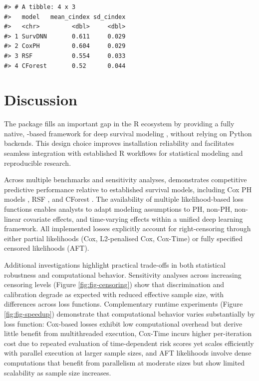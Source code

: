 \begin{verbatim}
#> # A tibble: 4 x 3
#>   model   mean_cindex sd_cindex
#>   <chr>         <dbl>     <dbl>
#> 1 SurvDNN       0.611     0.029
#> 2 CoxPH         0.604     0.029
#> 3 RSF           0.554     0.033
#> 4 CForest       0.52      0.044
\end{verbatim}

\section{Discussion}\label{discussion}

The  package fills an important gap in the R ecosystem by providing a fully native, -based framework for deep survival modeling \citep{falbel2024torch}, without relying on Python backends. This design choice improves installation reliability and facilitates seamless integration with established R workflows for statistical modeling and reproducible research.

Across multiple benchmarks and sensitivity analyses,  demonstrates competitive predictive performance relative to established survival models, including Cox PH models \citep{cox1972regression}, RSF \citep{ishwaran2008random}, and CForest \citep{hothorn2006survival}. The availability of multiple likelihood-based loss functions enables analysts to adapt modeling assumptions to PH, non-PH, non-linear covariate effects, and time-varying effects within a unified deep learning framework. All implemented losses explicitly account for right-censoring through either partial likelihoods (Cox, L2-penalised Cox, Cox-Time) or fully specified censored likelihoods (AFT).

Additional investigations highlight practical trade-offs in both statistical robustness and computational behavior. Sensitivity analyses across increasing censoring levels (Figure \ref{fig:fig-censoring}) show that discrimination and calibration degrade as expected with reduced effective sample size, with differences across loss functions. Complementary runtime experiments (Figure \ref{fig:fig-speedup}) demonstrate that computational behavior varies substantially by loss function: Cox-based losses exhibit low computational overhead but derive little benefit from multithreaded execution, Cox-Time incurs higher per-iteration cost due to repeated evaluation of time-dependent risk scores yet scales efficiently with parallel execution at larger sample sizes, and AFT likelihoods involve dense computations that benefit from parallelism at moderate sizes but show limited scalability as sample size increases.

